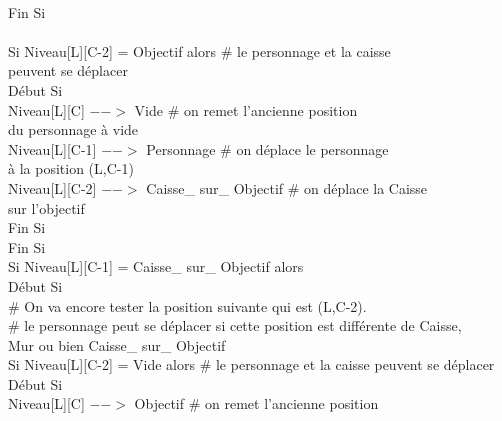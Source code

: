 \documentclass{article}
\begin{document}
\begin{tabbing}
\\	\hspace{4cm}		Fin Si
\\
\\	\hspace{4cm}		Si Niveau[L][C-2] = Objectif alors         	\# le personnage et la caisse
\\ \hspace{4cm} peuvent se déplacer
\\	\hspace{4cm}		Début Si
\\	\hspace{5cm}			Niveau[L][C] $-->$ Vide 			\# on remet l'ancienne position
\\ \hspace{5cm} du personnage à vide
\\	\hspace{5cm}			Niveau[L][C-1] $-->$ Personnage		\# on déplace le personnage
\\ \hspace{5cm} à la position (L,C-1)
\\	\hspace{5cm}			Niveau[L][C-2] $-->$ Caisse\_ sur\_ Objectif	\# on déplace la Caisse
\\ \hspace{5cm} sur l'objectif
\\	\hspace{4cm}		Fin Si
\\	\hspace{3cm}	Fin Si 
\\	\hspace{3cm}	Si Niveau[L][C-1] = Caisse\_ sur\_ Objectif alors			
\\	\hspace{3cm}	Début Si
\\	\hspace{4cm}		\# On va encore tester la position suivante qui est (L,C-2). 
\\	\hspace{4cm}		\# le personnage peut se déplacer si cette position est différente de Caisse,
\\ \hspace{4cm} Mur ou bien Caisse\_ sur\_ Objectif
\\	\hspace{4cm}		Si Niveau[L][C-2] = Vide alors         			\# le personnage et la caisse peuvent se déplacer
\\	\hspace{4cm}		Début Si
\\	\hspace{5cm}			Niveau[L][C] $-->$ Objectif 			\# on remet l'ancienne position

\end{tabbing}
\end{document}
